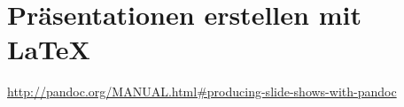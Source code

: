 \chapter{Präsentationen erstellen mit \LaTeX}

\url{http://pandoc.org/MANUAL.html#producing-slide-shows-with-pandoc}

